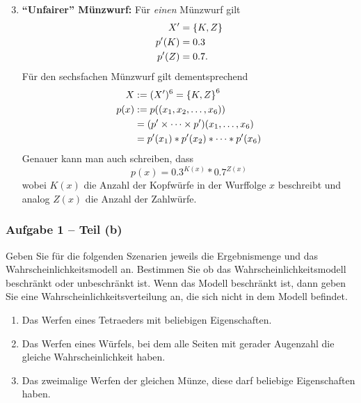\documentclass{beamer}
\begin{document}
\begin{frame}
	\footnotesize
	\begin{enumerate}[1.]
		\setcounter{enumi}{2}
		\item \textbf{\enquote{Unfairer} Münzwurf:} 
		Für \textit{einen} Münzwurf gilt
		\begin{align*}
			X' &= \left\{ K, Z \right\} \\
			p'(K) &= 0.3 \\
			p'(Z) &= 0.7.
		\end{align*}
		Für den sechsfachen Münzwurf gilt dementsprechend
		\begin{align*}
			X &\mathrel{:=} (X')^6 = \left\{ K, Z \right\}^6 \\
			p(x) &\mathrel{:=} p((x_1, x_2, \dots, x_6)) \\
			&= (p' \times \dots \times p')(x_1, \dots, x_6) \\
			&= p'(x_1) * p'(x_2) * \dots * p'(x_6)
		\end{align*}
		Genauer kann man auch schreiben, dass 
		\begin{equation*}
			p(x) = 0.3^{K(x)} * 0.7^{Z(x)}
		\end{equation*}
		wobei $K(x)$ die Anzahl der Kopfwürfe in der Wurffolge $x$ beschreibt und analog $Z(x)$ die Anzahl der Zahlwürfe.
	\end{enumerate}
\end{frame}

\begin{frame} \frametitle{Aufgabe 1 -- Teil (b)}
	\justifying\small
	Geben Sie für die folgenden Szenarien jeweils die Ergebnismenge und das Wahrscheinlichkeitsmodell an. Bestimmen Sie ob das Wahrscheinlichkeitsmodell beschränkt oder unbeschränkt ist. Wenn das Modell beschränkt ist, dann geben Sie eine Wahrscheinlichkeitsverteilung an, die sich nicht in dem Modell befindet.
	\begin{enumerate}[1.]
		\item Das Werfen eines Tetraeders mit beliebigen Eigenschaften.
		\item Das Werfen eines Würfels, bei dem alle Seiten mit gerader Augenzahl die gleiche
		Wahrscheinlichkeit haben.
		\item Das zweimalige Werfen der gleichen Münze, diese darf beliebige Eigenschaften haben.
	\end{enumerate}
\end{frame}
\end{document}

